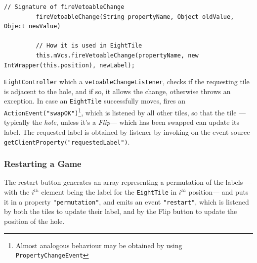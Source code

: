    {
      \begin{lstlisting}[label=lst:fireVetoableChange,captionpos=b,caption={How \lstinline|fireVetoableChange| is used in \lstinline|EightTile|}]
         // Signature of fireVetoableChange
         fireVetoableChange(String propertyName, Object oldValue, Object newValue)

         // How it is used in EightTile
         this.mVcs.fireVetoableChange(propertyName, new IntWrapper(this.position), newLabel);
      \end{lstlisting}
   }

\lstinline|EightController| which a \lstinline|vetoableChangeListener|, checks if the requesting tile is adjacent to the hole, and if so, it allows the change, otherwise throws an exception.
In case an \lstinline|EightTile| successfully moves, fires an \lstinline|ActionEvent("swapOK")|\footnote{Almost analogous behaviour may be obtained by using \lstinline|PropertyChangeEvent|}, which is listened by all other tiles, so that the tile ---typically the \textit{hole}, unless it's a \textit{Flip}--- which has been swapped can update its label.
The requested label is obtained by listener by invoking on the event source \lstinline|getClientProperty("requestedLabel")|.

\subsubsection{Restarting a Game}
The restart button generates an array representing a permutation of the labels ---with the $i^{th}$ element being the label for the \lstinline|EightTile| in $i^{th}$ position--- and puts it in a property \lstinline|"permutation"|, and emits an event \lstinline|"restart"|, which is listened by both the tiles to update their label, and by the Flip button to update the position of the hole.


